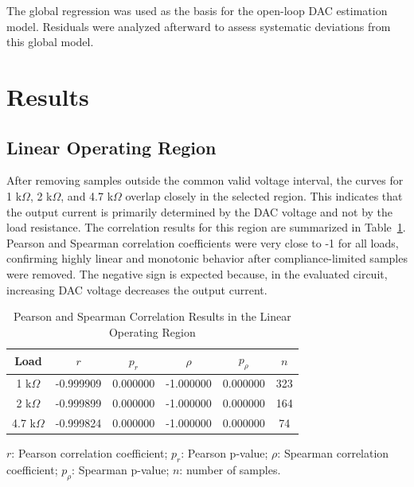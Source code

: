 \documentclass[conference]{IEEEtran}
\begin{document}
The global regression was used as the basis for the open-loop DAC estimation model. Residuals were analyzed afterward to assess systematic deviations from this global model.

\newpage
\section{Results}

\subsection{Linear Operating Region}

After removing samples outside the common valid voltage interval, the curves for 1 k$\Omega$, 2 k$\Omega$, and 4.7 k$\Omega$ overlap closely in the selected region. This indicates that the output current is primarily determined by the DAC voltage and not by the load resistance. The correlation results for this region are summarized in Table~\ref{tab:correlation}. Pearson and Spearman correlation coefficients were very close to -1 for all loads, confirming highly linear and monotonic behavior after compliance-limited samples were removed. The negative sign is expected because, in the evaluated circuit, increasing DAC voltage decreases the output current.

\begin{table}[!htbp]
\caption{Pearson and Spearman Correlation Results in the Linear Operating Region}
\begin{center}
\scriptsize
\renewcommand{\arraystretch}{0.92}
\begin{tabular}{|c|c|c|c|c|c|}
\hline
\textbf{Load} & \textbf{$r$} & \textbf{$p_r$} & \textbf{$\rho$} & \textbf{$p_\rho$} & \textbf{$n$} \\
\hline
1 k$\Omega$ & -0.999909 & 0.000000 & -1.000000 & 0.000000 & 323 \\
\hline
2 k$\Omega$ & -0.999899 & 0.000000 & -1.000000 & 0.000000 & 164 \\
\hline
4.7 k$\Omega$ & -0.999824 & 0.000000 & -1.000000 & 0.000000 & 74 \\
\hline
\end{tabular}
\renewcommand{\arraystretch}{1}
\vspace{1mm}

\parbox{\columnwidth}{\scriptsize $r$: Pearson correlation coefficient; $p_r$: Pearson p-value; $\rho$: Spearman correlation coefficient; $p_\rho$: Spearman p-value; $n$: number of samples.}
\label{tab:correlation}
\end{center}
\end{table}
\end{document}
